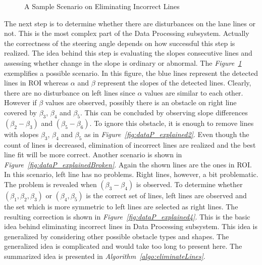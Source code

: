 \documentclass[a4paper,12pt]{article}
\begin{document}
\begin{enumerate}[A.]
\begin{figure}[t!]
\caption{\label{fig:dataP_explained} A Sample Scenario on Eliminating Incorrect Lines}

\end{figure}





The next step is to determine whether there are disturbances on the lane lines or not. This is the most complex part of the Data Processing subsystem. Actually the correctness of the steering angle depends on how successful this step is realized. The idea behind this step is evaluating the slopes consecutive lines and assessing whether change in the slope is ordinary or abnormal. The \textit{Figure~\ref{fig:dataP_explained}} exemplifies a possible scenario. In this figure, the blue lines represent the detected lines in ROI whereas $\alpha$ and $\beta$ represent the slopes of the detected lines. Clearly, there are no disturbance on left lines since $\alpha$ values are similar to each other. However if $\beta$ values are observed, possibly there is an obstacle on right line covered by $\beta_3$, $\beta_4$ and $\beta_5$. This can be concluded by observing slope differences $(\beta_2 - \beta_3)$ and $(\beta_5 - \beta_6)$. To ignore this obstacle, it is enough to remove lines with slopes $\beta_3$, $\beta_4$ and $\beta_5$ as in \textit{Figure~\ref{fig:dataP_explained2}}. Even though the count of lines is decreased, elimination of incorrect lines are realized and the best line fit will be more correct. Another scenario is shown in \textit{Figure~\ref{fig:dataP_explainedBroken}}. Again the shown lines are the ones in ROI. In this scenario, left line has no problems. Right lines, however, a bit problematic. The problem is revealed when  $(\beta_3 - \beta_4)$ is observed. To determine whether  $(\beta_1, \beta_2, \beta_3)$ or $(\beta_4, \beta_5)$ is the correct set of lines, left lines are observed and the set which is more symmetric to left lines are selected as right lines. The resulting correction is shown in \textit{Figure~\ref{fig:dataP_explained4}}.	This is the basic idea behind eliminating incorrect lines in Data Processing subsystem. This idea is generalized by considering other possible obstacle types and shapes. The generalized idea is complicated and would take too long to present here. The summarized idea is presented in \textit{Algorithm~\ref{algo:eliminateLines}}.

\begin{figure}[t!]

\setlength{\unitlength}{\textwidth} 


\end{figure}
\end{enumerate}
\end{document}
